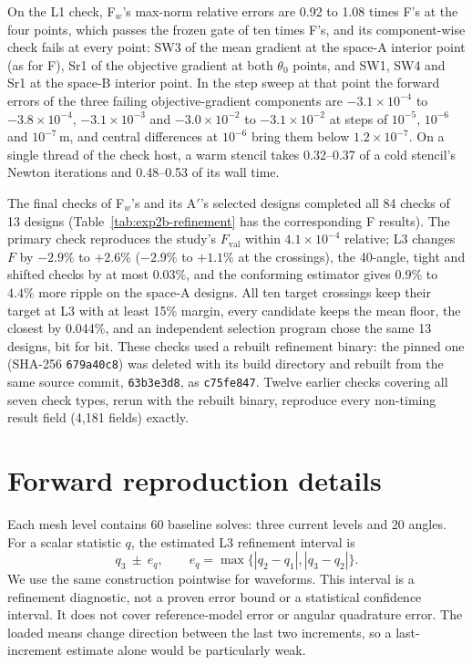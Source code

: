 \documentclass{anvil-paper}
\begin{document}
On the L1 check, F$_w$'s max-norm relative errors are 0.92 to 1.08 times
F's at the four points, which passes the frozen gate of ten times F's, and
its component-wise check fails at every point: SW3 of the mean gradient at
the space-A interior point (as for F), Sr1 of the objective gradient at
both $\theta_0$ points, and SW1, SW4 and Sr1 at the space-B interior point.
In the step sweep at that point the forward errors of the three failing
objective-gradient components are $-3.1\times10^{-4}$ to $-3.8\times10^{-4}$,
$-3.1\times10^{-3}$ and $-3.0\times10^{-2}$ to $-3.1\times10^{-2}$ at steps
of $10^{-5}$, $10^{-6}$ and $10^{-7}$\,m, and central differences at
$10^{-6}$ bring them below $1.2\times10^{-7}$. On a single thread of the
check host, a warm stencil takes 0.32--0.37 of a cold stencil's Newton
iterations and 0.48--0.53 of its wall time.

The final checks of F$_w$'s and its A$'$'s selected designs completed all 84
checks of 13 designs (Table~\ref{tab:exp2b-refinement} has the
corresponding F results). The primary check reproduces the study's
$F_{\mathrm{val}}$ within $4.1\times10^{-4}$ relative; L3 changes $F$ by
$-2.9\%$ to $+2.6\%$ ($-2.9\%$ to $+1.1\%$ at the crossings), the 40-angle,
tight and shifted checks by at most $0.03\%$, and the conforming estimator
gives $0.9\%$ to $4.4\%$ more ripple on the space-A designs. All ten target
crossings keep their target at L3 with at least 15\% margin, every
candidate keeps the mean floor, the closest by 0.044\%, and an independent
selection program chose the same 13 designs, bit for bit. These checks used
a rebuilt refinement binary: the pinned one (SHA-256 \texttt{679a40c8}) was
deleted with its build directory and rebuilt from the same source commit,
\texttt{63b3e3d8}, as \texttt{c75fe847}. Twelve earlier checks covering all
seven check types, rerun with the rebuilt binary, reproduce every
non-timing result field (4,181 fields) exactly.

\begin{table}[H]\centering\small
\caption{Warm-stencil arm: charged time units to the first attaining
validation for A$'$ and F$_w$ (repeat~1, F$_w$ session units) and their
ratio per start, with the geometric mean.}
\label{tab:exp2c-ratios}
\end{table}

\section{Forward reproduction details}\label{sec:forward}
Each mesh
level contains 60 baseline solves: three current levels and 20 angles. For
a scalar statistic $q$, the estimated L3 refinement interval is
\begin{equation}
 q_3\ \pm\ e_q,\qquad
 e_q=\max\{|q_2-q_1|,|q_3-q_2|\}.
 \label{eq:band}
\end{equation}
We use the same construction pointwise for waveforms. This interval is a
refinement diagnostic, not a proven error bound or a statistical confidence
interval. It does not cover reference-model error or angular quadrature
error. The loaded means change direction between the last two increments,
so a last-increment estimate alone would be particularly weak.
\end{document}
